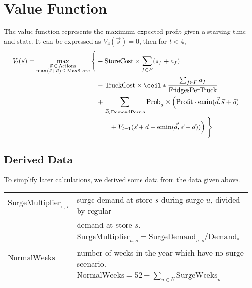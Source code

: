 \documentclass[11pt,a4paper]{article}
\begin{document}
\section{Value Function}
The value function represents the maximum expected profit given a starting time 
and state. It can be expressed as $V_4(\vec s) = 0$, then for $t < 4$,
\begin{align*}
    V_{t}(\vec s) = 
    \max_{ \substack{\vec a \,\in\, \mathrm{Actions} \\ \max \,(\vec s + \vec a)\, \le\, \mathrm{MaxStore} } }\Bigg\{& 
        -\mathrm{StoreCost}\times\sum_{f \in F} (s_f + a_f) \\ 
        &-\mathrm{TruckCost}\times \ceil*{\frac{\sum_{f\in F} a_f}{\mathrm{FridgesPerTruck}}} \\ 
        & + \sum_{\vec d \in \mathrm{DemandPerms}} \mathrm{Prob}_{\vec d} \times \Big( \mathrm{Profit} \cdot \mathrm{emin} ( \vec d, \vec s + \vec a)   \\ 
        & \qquad + V_{t+1} (\vec s + \vec a - \mathrm{emin} (\vec d, \vec s + \vec a) )\Big) \,\,\Bigg\}
\end{align*}

\subsection{Derived Data}
To simplify later calculations, we derived some data from the data given above.\\[0.8em]    
\begin{tabular}{l l}
    $\mathrm{SurgeMultiplier}_{u,s}$ & surge demand at store $s$ during surge $u$,  divided by regular \\ 
    &  demand at store $s$. \\ 
    &$\mathrm{SurgeMultiplier}_{u,s} = \mathrm{SurgeDemand}_{u,s} / \mathrm{Demand}_s $ \\
    $\mathrm{NormalWeeks}$ & number of weeks in the year which have no surge scenario. \\ 
    & $\mathrm{NormalWeeks} = 52-\sum_{u \in U} \mathrm{SurgeWeeks}_u $
\end{tabular}
\end{document}
